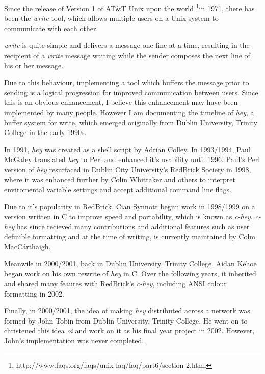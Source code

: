 Since the release of Version 1 of AT\&T Unix upon the world 
\footnote{http://www.faqs.org/faqs/unix-faq/faq/part6/section-2.html}{in 1971}, 
there has been the \emph{write} tool, which allows multiple users on a Unix 
system to communicate with each other.


\emph{write} is quite simple and delivers a message one line at a time,
resulting in the recipient of a \emph{write} message waiting while the
sender composes the next line of his or her message.


Due to this behaviour, implementing a tool which buffers the message
prior to sending is a logical progression for improved communication
between users. Since this is an obvious enhancement, I believe this
enhancement may have been implemented by many people. However I am 
documenting the timeline of \emph{hey}, a buffer system for write,
which emerged originally from Dublin University, Trinity College in the 
early 1990s.


In 1991, \emph{hey} was created as a shell script by Adrian Colley. In 
1993/1994, Paul McGaley translated \emph{hey} to Perl and enhanced it's 
usability until 1996. Paul's Perl version of \emph{hey} resurfaced in 
Dublin City University's RedBrick Society in 1998, where it was enhanced
further by Colin Whittaker and others to interpret enviromental variable 
settings and accept additional command line flags.


Due to it's popularity in RedBrick, Cian Synnott begun work in 1998/1999
on a version written in C to improve speed and portability, which is 
known as \emph{c-hey}. \emph{c-hey} has since recieved many 
contributions and additional features such as user definible formatting 
and at the time of writing, is currently maintained by Colm 
MacC\'{a}rthaigh.


Meanwile in 2000/2001, back in Dublin University, Trinity College, Aidan 
Kehoe began work on his own rewrite of \emph{hey} in C. Over the 
following years, it inherited and shared many feaures with RedBrick's 
\emph{c-hey}, including ANSI colour formatting in 2002.


Finally, in 2000/2001, the idea of making \emph{hey} distributed across 
a network was formed by John Tobin from Dublin University, Trinity 
College.  He went on to christened this idea \emph{oi} and work on it 
as his final year project in 2002. However, John's implementation was
never completed.
